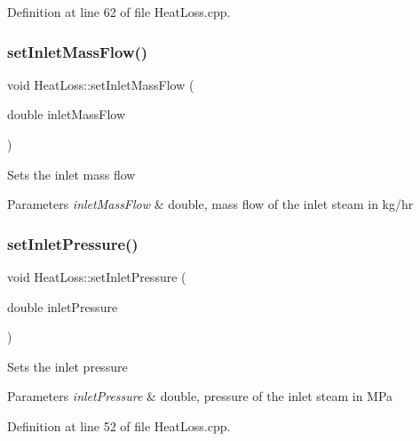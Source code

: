 Definition at line 62 of file Heat\+Loss.\+cpp.

\mbox{\label{class_heat_loss_ac4154dc9922b6ddf3f2e7a10cc64c61f}} 
\subsubsection{\texorpdfstring{set\+Inlet\+Mass\+Flow()}{setInletMassFlow()}\hspace{0.1cm}{\footnotesize\ttfamily [3/3]}}
{\footnotesize\ttfamily void Heat\+Loss\+::set\+Inlet\+Mass\+Flow (\begin{DoxyParamCaption}\item[{double}]{inlet\+Mass\+Flow }\end{DoxyParamCaption})}

Sets the inlet mass flow 
\begin{DoxyParams}{Parameters}
{\em inlet\+Mass\+Flow} & double, mass flow of the inlet steam in kg/hr \\
\hline
\end{DoxyParams}
\mbox{\label{class_heat_loss_ab0a6b1f2a964d161d25758318f25f7e3}} 
\subsubsection{\texorpdfstring{set\+Inlet\+Pressure()}{setInletPressure()}\hspace{0.1cm}{\footnotesize\ttfamily [1/3]}}
{\footnotesize\ttfamily void Heat\+Loss\+::set\+Inlet\+Pressure (\begin{DoxyParamCaption}\item[{double}]{inlet\+Pressure }\end{DoxyParamCaption})}

Sets the inlet pressure 
\begin{DoxyParams}{Parameters}
{\em inlet\+Pressure} & double, pressure of the inlet steam in M\+Pa \\
\hline
\end{DoxyParams}


Definition at line 52 of file Heat\+Loss.\+cpp.

